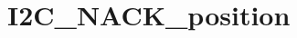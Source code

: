 \hypertarget{group___i2_c___n_a_c_k__position}{\section{I2\-C\-\_\-\-N\-A\-C\-K\-\_\-position}
\label{group___i2_c___n_a_c_k__position}
}
